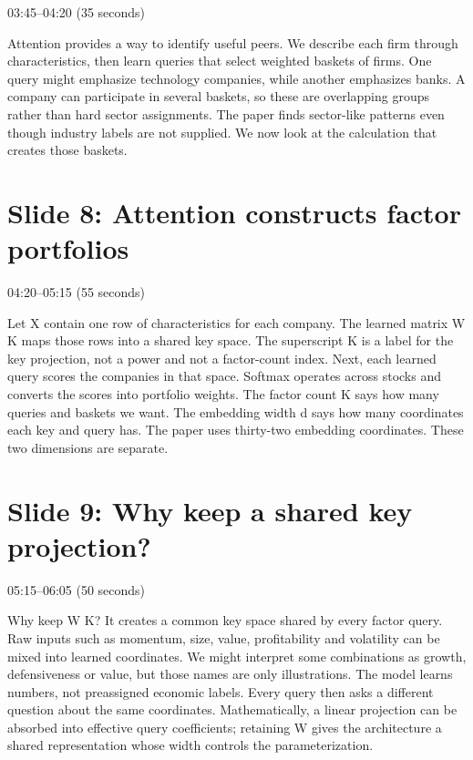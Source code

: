 \documentclass[11pt]{article}
\begin{document}
\textcolor{SBred}{03:45--04:20 (35 seconds)}

Attention provides a way to identify useful peers. We describe each firm through characteristics, then learn queries that select weighted baskets of firms. One query might emphasize technology companies, while another emphasizes banks. A company can participate in several baskets, so these are overlapping groups rather than hard sector assignments. The paper finds sector-like patterns even though industry labels are not supplied. We now look at the calculation that creates those baskets.

\section*{Slide 8: Attention constructs factor portfolios}

\textcolor{SBred}{04:20--05:15 (55 seconds)}

Let X contain one row of characteristics for each company. The learned matrix W K maps those rows into a shared key space. The superscript K is a label for the key projection, not a power and not a factor-count index. Next, each learned query scores the companies in that space. Softmax operates across stocks and converts the scores into portfolio weights. The factor count K says how many queries and baskets we want. The embedding width d says how many coordinates each key and query has. The paper uses thirty-two embedding coordinates. These two dimensions are separate.

\section*{Slide 9: Why keep a shared key projection?}

\textcolor{SBred}{05:15--06:05 (50 seconds)}

Why keep W K? It creates a common key space shared by every factor query. Raw inputs such as momentum, size, value, profitability and volatility can be mixed into learned coordinates. We might interpret some combinations as growth, defensiveness or value, but those names are only illustrations. The model learns numbers, not preassigned economic labels. Every query then asks a different question about the same coordinates. Mathematically, a linear projection can be absorbed into effective query coefficients; retaining W gives the architecture a shared representation whose width controls the parameterization.
\end{document}

